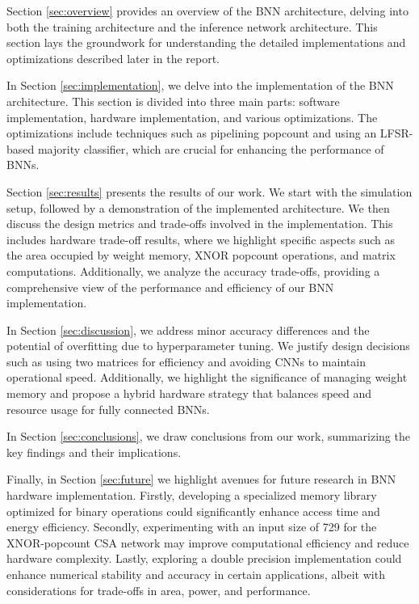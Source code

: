 \documentclass[conference]{IEEEtran}
\begin{document}
Section \ref{sec:overview} provides an overview of the BNN architecture, delving into both the training architecture and the inference network architecture. This section lays the groundwork for understanding the detailed implementations and optimizations described later in the report.

In Section \ref{sec:implementation}, we delve into the implementation of the BNN architecture. This section is divided into three main parts: software implementation, hardware implementation, and various optimizations. The optimizations include techniques such as pipelining popcount and using an LFSR-based majority classifier, which are crucial for enhancing the performance of BNNs.

Section \ref{sec:results} presents the results of our work. We start with the simulation setup, followed by a demonstration of the implemented architecture. We then discuss the design metrics and trade-offs involved in the implementation. This includes hardware trade-off results, where we highlight specific aspects such as the area occupied by weight memory, XNOR popcount operations, and matrix computations. Additionally, we analyze the accuracy trade-offs, providing a comprehensive view of the performance and efficiency of our BNN implementation.

In Section \ref{sec:discussion}, we address minor accuracy differences and the potential of overfitting due to hyperparameter tuning. We justify design decisions such as using two matrices for efficiency and avoiding CNNs to maintain operational speed. Additionally, we highlight the significance of managing weight memory and propose a hybrid hardware strategy that balances speed and resource usage for fully connected BNNs.

In Section \ref{sec:conclusions}, we draw conclusions from our work, summarizing the key findings and their implications.

Finally, in Section \ref{sec:future} we highlight avenues for future research in BNN hardware implementation. Firstly, developing a specialized memory library optimized for binary operations could significantly enhance access time and energy efficiency. Secondly, experimenting with an input size of 729 for the XNOR-popcount CSA network may improve computational efficiency and reduce hardware complexity. Lastly, exploring a double precision implementation could enhance numerical stability and accuracy in certain applications, albeit with considerations for trade-offs in area, power, and performance.
\end{document}

